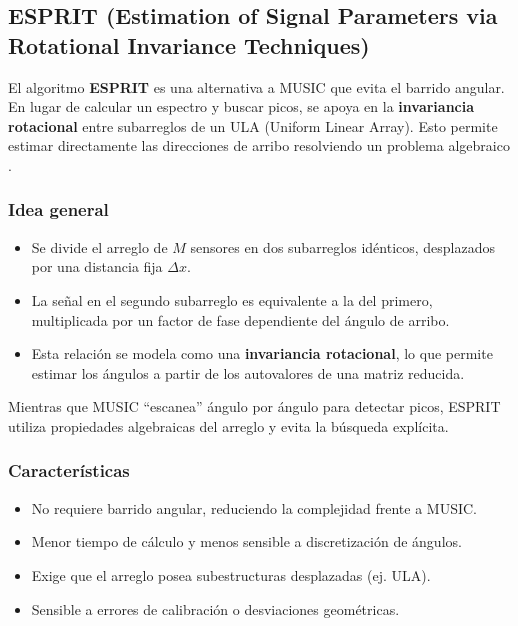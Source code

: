\subsection{ESPRIT (Estimation of Signal Parameters via Rotational Invariance Techniques)}\label{sec:doa:esprit}

El algoritmo \textbf{ESPRIT} es una alternativa a MUSIC que evita el barrido angular.  
En lugar de calcular un espectro y buscar picos, se apoya en la 
\textbf{invariancia rotacional} entre subarreglos de un ULA (Uniform Linear Array).  
Esto permite estimar directamente las direcciones de arribo resolviendo un problema algebraico \cite{Gupta2015}.

\subsubsection*{Idea general}
\begin{itemize}
	\item Se divide el arreglo de $M$ sensores en dos subarreglos idénticos, 
	desplazados por una distancia fija $\Delta x$.  
	\item La señal en el segundo subarreglo es equivalente a la del primero, 
	multiplicada por un factor de fase dependiente del ángulo de arribo.  
	\item Esta relación se modela como una \textbf{invariancia rotacional}, 
	lo que permite estimar los ángulos a partir de los autovalores de una matriz reducida.  
\end{itemize}

Mientras que MUSIC “escanea” ángulo por ángulo para detectar picos,  
ESPRIT utiliza propiedades algebraicas del arreglo y evita la búsqueda explícita.

\subsubsection*{Características}
\begin{itemize}
	\item No requiere barrido angular, reduciendo la complejidad frente a MUSIC.  
	\item Menor tiempo de cálculo y menos sensible a discretización de ángulos.  
	\item Exige que el arreglo posea subestructuras desplazadas (ej. ULA).  
	\item Sensible a errores de calibración o desviaciones geométricas.  
\end{itemize}

